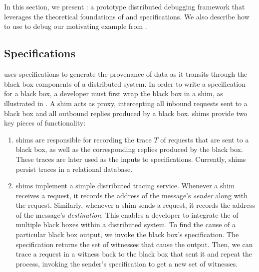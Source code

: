 \section{\fluent{}}
In this section, we present \fluent{}: a prototype distributed debugging
framework that leverages the theoretical foundations of \watprovenance{} and
\watprovenance{} specifications. We also describe how to use \fluent{} to debug
our motivating example from .

\subsection{\WatProvenance{} Specifications}
{}

\fluent{} uses \watprovenance{} specifications to generate the provenance of
data as it transits through the black box components of a distributed system.
In order to write a \watprovenance{} specification for a black box, a developer
must first wrap the black box in a \fluent{} shim, as illustrated in
. A shim acts as proxy, intercepting all inbound requests
sent to a black box and all outbound replies produced by a black box. \fluent{}
shims provide two key pieces of functionality:
\begin{enumerate}
  \item
    \fluent{} shims are responsible for recording the trace $T$ of requests
    that are sent to a black box, as well as the corresponding replies produced
    by the black box. These traces are later used as the inputs to
    \watprovenance{} specifications.  Currently, \fluent{} shims persist traces
    in a relational database.

  \item
    \fluent{} shims implement a simple distributed tracing service. Whenever a
    \fluent{} shim receives a request, it records the address of the message's
    \emph{sender} along with the request. Similarly, whenever a \fluent{} shim
    sends a request, it records the address of the message's \emph{destination}.
    This enables a developer to integrate the \watprovenance{} of multiple
    black boxes within a distributed system. To find the cause of a particular
    black box output, we invoke the black box's \watprovenance{} specification.
    The specification returns the set of witnesses that cause the output. Then,
    we can trace a request in a witness back to the black box that sent it and
    repeat the process, invoking the sender's \watprovenance{} specification to
    get a new set of witnesses.
\end{enumerate}

